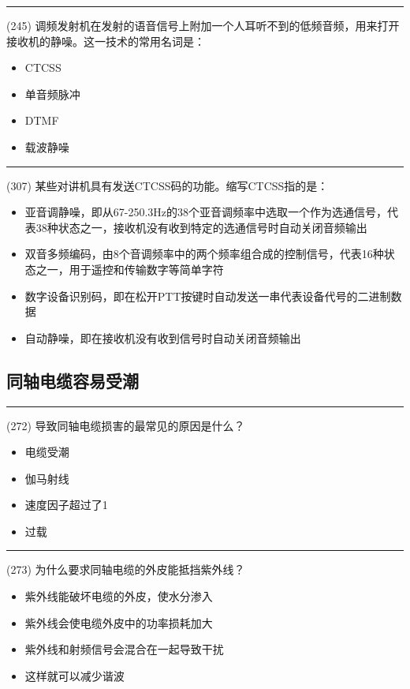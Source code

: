 \documentclass[twocolumn,hyperref,UTF8]{ctexart}  %
\begin{document}
\noindent\rule{0.5\textwidth}{1pt}
\heiti (245) 调频发射机在发射的语音信号上附加一个人耳听不到的低频音频，用来打开接收机的静噪。这一技术的常用名词是： \songti {\color{gray} [LK1099] }
\begin{itemize}
	\item  CTCSS
	\item  单音频脉冲
	\item  DTMF
	\item  载波静噪
\end{itemize}


\noindent\rule{0.5\textwidth}{1pt}
\heiti (307) 某些对讲机具有发送CTCSS码的功能。缩写CTCSS指的是： \songti {\color{gray} [LK0262] }
\begin{itemize}
	\item  亚音调静噪，即从67-250.3Hz的38个亚音调频率中选取一个作为选通信号，代表38种状态之一，接收机没有收到特定的选通信号时自动关闭音频输出
	\item  双音多频编码，由8个音调频率中的两个频率组合成的控制信号，代表16种状态之一，用于遥控和传输数字等简单字符
	\item  数字设备识别码，即在松开PTT按键时自动发送一串代表设备代号的二进制数据
	\item  自动静噪，即在接收机没有收到信号时自动关闭音频输出
\end{itemize}


\clearpage
\subsection{同轴电缆容易受潮}


\noindent\rule{0.5\textwidth}{1pt}
\heiti (272) 导致同轴电缆损害的最常见的原因是什么？ \songti {\color{gray} [LK1189] }
\begin{itemize}
	\item  电缆受潮
	\item  伽马射线
	\item  速度因子超过了1
	\item  过载
\end{itemize}


\noindent\rule{0.5\textwidth}{1pt}
\heiti (273) 为什么要求同轴电缆的外皮能抵挡紫外线？ \songti {\color{gray} [LK1190] }
\begin{itemize}
	\item  紫外线能破坏电缆的外皮，使水分渗入
	\item  紫外线会使电缆外皮中的功率损耗加大
	\item  紫外线和射频信号会混合在一起导致干扰
	\item  这样就可以减少谐波
\end{itemize}
\end{document}
